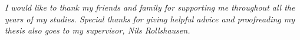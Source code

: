 
\bigskip

\begingroup
\let\clearpage\relax
\let\cleardoublepage\relax
\let\cleardoublepage\relax

{\slshape 
I would like to thank my friends and family for supporting me throughout all the years of my studies. Special thanks for giving helpful advice and proofreading my thesis also goes to my supervisor, Nils Rollshausen.


}


\vspace{15cm}

\endgroup

